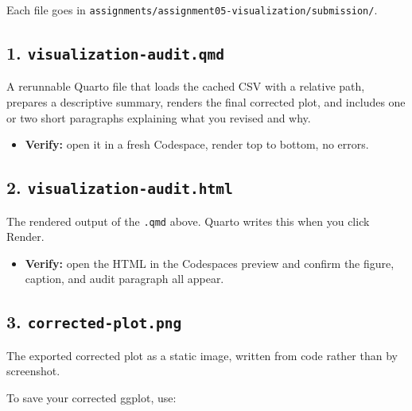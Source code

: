 \documentclass[
  letterpaper,
  DIV=11,
  numbers=noendperiod,
  oneside]{scrreprt}
\providecommand{\tightlist}{%
  \setlength{\itemsep}{0pt}\setlength{\parskip}{0pt}}
\begin{document}

Each file goes in
\texttt{assignments/assignment05-visualization/submission/}.

\subsection*{\texorpdfstring{1.
\texttt{visualization-audit.qmd}}{1. visualization-audit.qmd}}\label{visualization-audit.qmd}

A rerunnable Quarto file that loads the cached CSV with a relative path,
prepares a descriptive summary, renders the final corrected plot, and
includes one or two short paragraphs explaining what you revised and
why.

\begin{itemize}
\tightlist
\item
  \textbf{Verify:} open it in a fresh Codespace, render top to bottom,
  no errors.
\end{itemize}

\subsection*{\texorpdfstring{2.
\texttt{visualization-audit.html}}{2. visualization-audit.html}}\label{visualization-audit.html}

The rendered output of the \texttt{.qmd} above. Quarto writes this when
you click Render.

\begin{itemize}
\tightlist
\item
  \textbf{Verify:} open the HTML in the Codespaces preview and confirm
  the figure, caption, and audit paragraph all appear.
\end{itemize}

\subsection*{\texorpdfstring{3.
\texttt{corrected-plot.png}}{3. corrected-plot.png}}\label{corrected-plot.png}

The exported corrected plot as a static image, written from code rather
than by screenshot.

To save your corrected ggplot, use:
\end{document}
